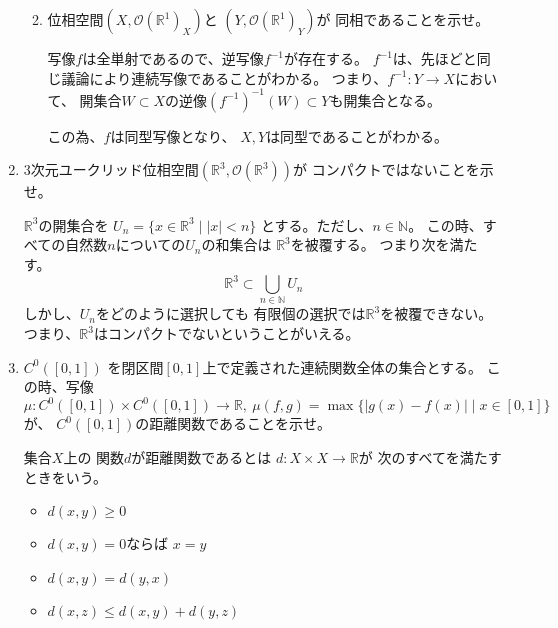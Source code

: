 \documentclass[12pt,b5paper]{ltjsarticle}
\begin{document}
\begin{enumerate}
\begin{enumerate}
             \hrulefill

        \item
             位相空間$(X,\mathscr{O}(\mathbb{R}^1)_X)$と
             $(Y,\mathscr{O}(\mathbb{R}^1)_Y)$が
             同相であることを示せ。

             \dotfill

             写像$f$は全単射であるので、逆写像$f^{-1}$が存在する。
             $f^{-1}$は、先ほどと同じ議論により連続写像であることがわかる。
             つまり、$f^{-1}:Y\rightarrow X$において、
             開集合$W\subset X$の逆像$(f^{-1})^{-1}(W)\subset Y$も開集合となる。

             この為、$f$は同型写像となり、
             $X,Y$は同型であることがわかる。
 \end{enumerate}

       \hrulefill

 \item
      3次元ユークリッド位相空間$(\mathbb{R}^3, \mathscr{O}(\mathbb{R}^3))$が
      コンパクトではないことを示せ。

      \dotfill

      $\mathbb{R}^3$の開集合を
       $U_n =\{ x \in \mathbb{R}^3 \mid \lvert x \rvert <n\}$
       とする。ただし、$n\in \mathbb{N}$。
       この時、すべての自然数$n$についての$U_n$の和集合は
       $\mathbb{R}^3$を被覆する。
       つまり次を満たす。
       \begin{equation}
        \mathbb{R}^3 \subset \bigcup_{n\in\mathbb{N}} U_n
       \end{equation}
       しかし、$U_n$をどのように選択しても
       有限個の選択では$\mathbb{R}^3$を被覆できない。
       つまり、$\mathbb{R}^3$はコンパクトでないということがいえる。

       \hrulefill

 \item
      $C^0([0,1])$
      を閉区間$[0,1]$上で定義された連続関数全体の集合とする。
      この時、写像
     \begin{equation}
      \mu : C^0([0,1]) \times C^0([0,1]) \rightarrow \mathbb{R},\
       \mu(f,g)=\max\{ \lvert g(x)-f(x) \rvert \mid x\in [0,1] \}
     \end{equation}
      が、
      $C^0([0,1])$の距離関数であることを示せ。

      \dotfill

      集合$X$上の
      関数$d$が距離関数であるとは
      $d:X\times X \rightarrow \mathbb{R}$が
      次のすべてを満たすときをいう。
      \begin{itemize}
       \item $d(x,y)\geq 0$
       \item $d(x,y)= 0$ならば $x=y$
       \item $d(x,y)= d(y,x)$
       \item $d(x,z)\leq d(x,y)+d(y,z)$
      \end{itemize}


\end{enumerate}
\end{document}
